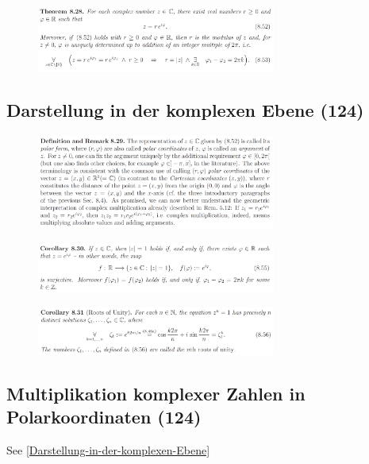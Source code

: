 \begin{figure}[H] \centering
\includegraphics[width=0.7\textwidth]{media/9-5.png}
\end{figure}

\subsection{Darstellung in der komplexen Ebene (124)}
\label{Darstellung-in-der-komplexen-Ebene}

\begin{figure}[H] \centering
\includegraphics[width=0.7\textwidth]{media/9-6.png}
\end{figure}
\begin{figure}[H] \centering
\includegraphics[width=0.7\textwidth]{media/9-6-2.png}
\end{figure}
\begin{figure}[H] \centering
\includegraphics[width=0.7\textwidth]{media/9-6-3.png}
\end{figure}

\subsection{Multiplikation komplexer Zahlen in Polarkoordinaten (124)}

See \autoref{Darstellung-in-der-komplexen-Ebene}